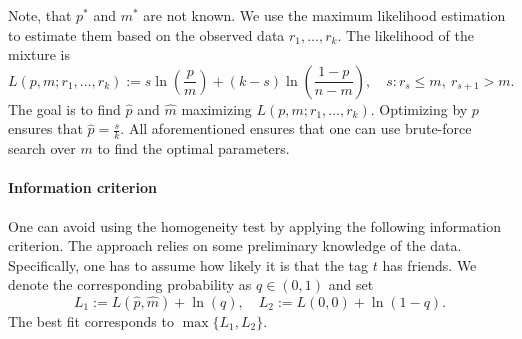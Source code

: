 \documentclass{llncs}
\begin{document}
Note, that $p^*$ and $m^*$ are not known.
We use the maximum likelihood estimation to estimate them based on the observed data $r_1, \dots, r_k$. The likelihood of the mixture is
\[
L(p, m; r_1, \dots, r_k) := s\ln\left(\frac{p}{m}\right) + (k-s)\ln\left(\frac{1-p}{n - m}\right),
\quad
s: r_{s} \le m, ~r_{s+1} > m.
\]
The goal is to find $\hat{p}$ and $\hat{m}$ maximizing $L(p, m; r_1, \dots, r_k)$. Optimizing by $p$ ensures that $\hat{p} = \frac{s}{k}$. All aforementioned ensures that one can use brute-force search over $m$ to find the optimal parameters.

\paragraph{Information criterion}
One can avoid using the homogeneity test by applying the following information criterion.
The approach relies on some preliminary knowledge of the data. Specifically, one has to assume how likely it is that the tag $t$ has friends. We denote the corresponding probability as $q \in (0, 1)$ and set
\[
L_1 := L(\hat{p}, \hat{m}) + \ln(q),
\quad
L_2 := L(0, 0) + \ln(1-q).
\]
The best fit corresponds to $\max\{L_1, L_2\}$.





\end{document}
